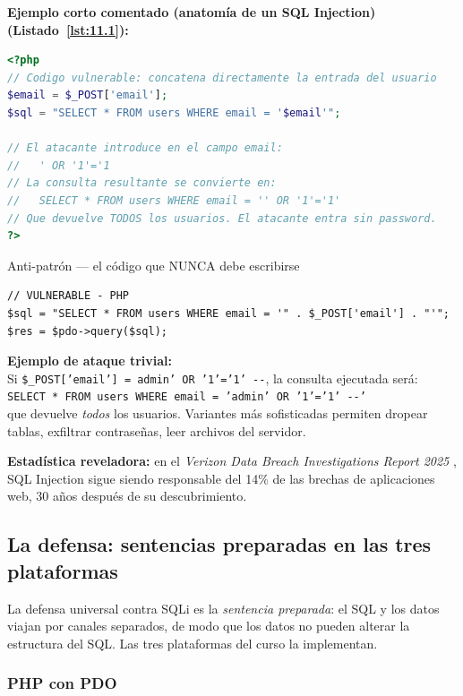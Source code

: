\documentclass[11pt,a4paper,openany]{book}
\begin{document}
\textbf{Ejemplo corto comentado (anatomía de un SQL Injection) (Listado~\ref{lst:11.1}):}
\begin{lstlisting}[language=PHP,numbers=none,caption={Ejemplo de PHP},label=lst:11.1]
<?php
// Codigo vulnerable: concatena directamente la entrada del usuario
$email = $_POST['email'];
$sql = "SELECT * FROM users WHERE email = '$email'";

// El atacante introduce en el campo email:
//   ' OR '1'='1
// La consulta resultante se convierte en:
//   SELECT * FROM users WHERE email = '' OR '1'='1'
// Que devuelve TODOS los usuarios. El atacante entra sin password.
?>
\end{lstlisting}


\begin{cajaadvertencia}{Anti-patrón --- el código que NUNCA debe escribirse}
\begin{lstlisting}[style=php,numbers=none,caption={Ejemplo de PHP},label=lst:11.2]
// VULNERABLE - PHP
$sql = "SELECT * FROM users WHERE email = '" . $_POST['email'] . "'";
$res = $pdo->query($sql);
\end{lstlisting}
\textbf{Ejemplo de ataque trivial:}\\
Si \texttt{\$\_POST['email'] = admin' OR '1'='1' -{}-}, la consulta
ejecutada será:\\
\texttt{SELECT * FROM users WHERE email = 'admin' OR '1'='1' -{}-'}\\
que devuelve \emph{todos} los usuarios. Variantes más sofisticadas
permiten dropear tablas, exfiltrar contraseñas, leer archivos del
servidor.

\textbf{Estadística reveladora:} en el \emph{Verizon Data Breach
Investigations Report 2025} \cite{verizon2025dbir}, SQL Injection
sigue siendo responsable del 14\% de las brechas de aplicaciones web,
30 años después de su descubrimiento.
\end{cajaadvertencia}

\subsection{La defensa: sentencias preparadas en las tres plataformas}

La defensa universal contra SQLi es la \emph{sentencia
preparada}: el SQL y los datos viajan por canales separados, de
modo que los datos no pueden alterar la estructura del SQL. Las
tres plataformas del curso la implementan.


\subsubsection{PHP con PDO}
\end{document}
